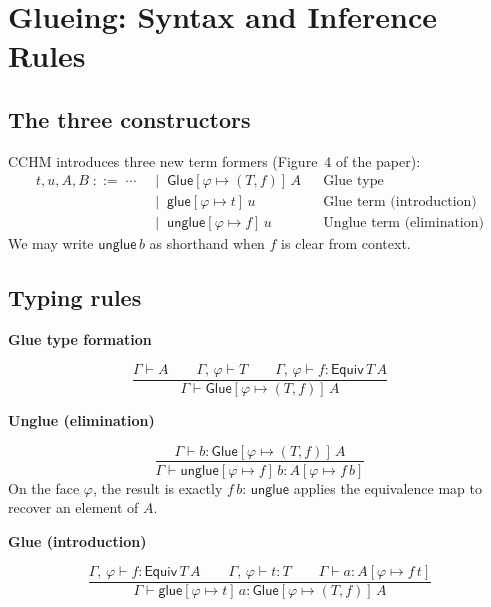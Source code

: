 \documentclass[11pt, a4paper]{article}
\newenvironment{rulebox}[1]{%
  \medskip\noindent\textbf{\textcolor{deepblue}{#1}}\nopagebreak\par\noindent%
  \begin{framed}\small%
}{\end{framed}\medskip}
\newcommand{\pt}[1]{\mathsf{#1}}
\newcommand{\GlueT}{\pt{Glue}}
\newcommand{\glueT}{\pt{glue}}
\newcommand{\unglueT}{\pt{unglue}}
\newcommand{\EquivT}{\pt{Equiv}}
\newcommand{\sys}[2]{[#1 \mapsto #2]}
\begin{document}
\section{Glueing: Syntax and Inference Rules}

\subsection{The three constructors}

CCHM introduces three new term formers (Figure~4 of the paper):
\begin{align*}
  t, u, A, B \;::=\; \cdots
  &\;\mid\; \GlueT\sys{\varphi}{(T,f)}\,A
    &&\text{Glue type}\\
  &\;\mid\; \glueT\sys{\varphi}{t}\,u
    &&\text{Glue term (introduction)}\\
  &\;\mid\; \unglueT\sys{\varphi}{f}\,u
    &&\text{Unglue term (elimination)}
\end{align*}
We may write $\unglueT\, b$ as shorthand when $f$ is clear from context.

\subsection{Typing rules}

\begin{rulebox}{Glue type formation}
\[
\frac{\Gamma \vdash A
\qquad
\Gamma,\,\varphi \vdash T
\qquad
\Gamma,\,\varphi \vdash f : \EquivT\, T\, A}
{\Gamma \vdash \GlueT\sys{\varphi}{(T,f)}\,A}
\]
\end{rulebox}

\begin{rulebox}{Unglue (elimination)}
\[
\frac{\Gamma \vdash b : \GlueT\sys{\varphi}{(T,f)}\,A}
     {\Gamma \vdash \unglueT\sys{\varphi}{f}\, b : A\sys{\varphi}{f\, b}}
\]
On the face $\varphi$, the result is exactly $f\, b$: $\unglueT$ applies the
equivalence map to recover an element of $A$.
\end{rulebox}

\begin{rulebox}{Glue (introduction)}
\[
\frac{\Gamma,\,\varphi \vdash f : \EquivT\, T\, A
\qquad
\Gamma,\,\varphi \vdash t : T
\qquad
\Gamma \vdash a : A\sys{\varphi}{f\, t}}
     {\Gamma \vdash \glueT\sys{\varphi}{t}\, a : \GlueT\sys{\varphi}{(T,f)}\,A}
\]
\end{rulebox}
\end{document}
